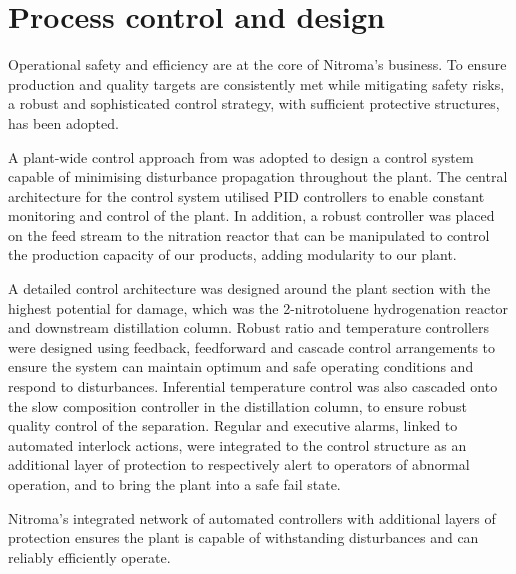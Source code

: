 \section*{Process control and design}

Operational safety and efficiency are at the core of Nitroma's business. To ensure production and quality targets are consistently met while mitigating safety risks, a robust and sophisticated control strategy, with sufficient protective structures, has been adopted.

A plant-wide control approach from \textcite{luyben_plantwide_1997} was adopted to design a control system capable of minimising disturbance propagation throughout the plant. The central architecture for the control system utilised PID controllers to enable constant monitoring and control of the plant. In addition, a robust controller was placed on the feed stream to the nitration reactor that can be manipulated to control the production capacity of our products, adding modularity to our plant.      


A detailed control architecture was designed around the plant section with the highest potential for damage, which was the 2-nitrotoluene hydrogenation reactor and downstream distillation column. Robust ratio and temperature controllers were designed using feedback, feedforward and cascade control arrangements to ensure the system can maintain optimum and safe operating conditions and respond to disturbances. Inferential temperature control was also cascaded onto the slow composition controller in the distillation column, to ensure robust quality control of the separation. Regular and executive alarms, linked to automated interlock actions, were integrated to the control structure as an additional layer of protection to respectively alert to operators of abnormal operation, and to bring the plant into a safe fail state. 

Nitroma's integrated network of automated controllers with additional layers of protection ensures the plant is capable of withstanding disturbances and can reliably efficiently operate. 



